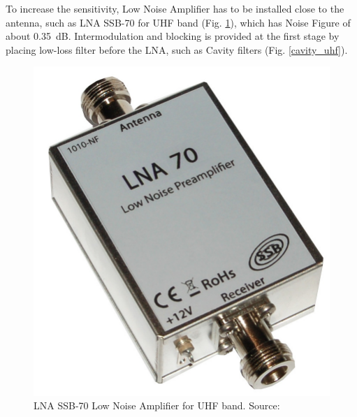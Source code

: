 To increase the sensitivity, Low Noise Amplifier has to be installed close to the antenna, such as LNA SSB-70 for UHF band (Fig. \ref{ssb_lna70}), which has Noise Figure of about \SI{0.35}{\dB}. Intermodulation and blocking is provided at the first stage by placing low-loss filter before the LNA, such as Cavity filters (Fig. \ref{cavity_uhf}).

\begin{minipage}{\linewidth}
    \centering
    \begin{minipage}{0.45\linewidth}
        \begin{figure}[H]
            \centering
            \includegraphics[width=0.3\paperwidth]{img/2/ssb_lna70.jpg}
            \caption{LNA SSB-70 Low Noise Amplifier for UHF band. Source: \cite{ssb_lna70}}
            \label{ssb_lna70}
        \end{figure}
    \end{minipage}
    \hspace{0.05\linewidth}
    \begin{minipage}{0.45\linewidth}
        \begin{figure}[H]
            \centering

\end{figure}
\end{minipage}
\end{minipage}
